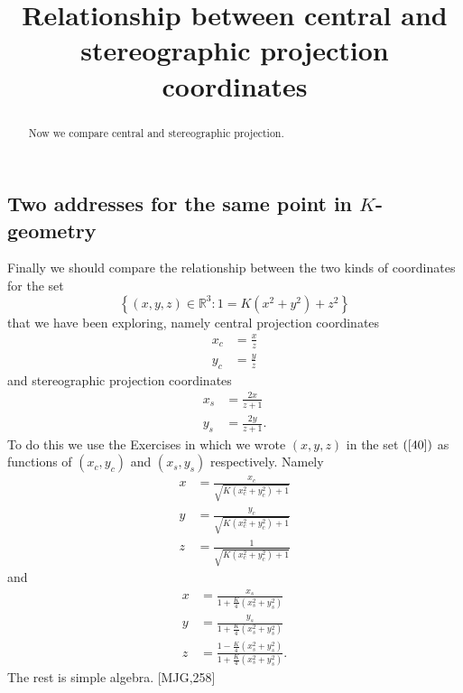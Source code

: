 \documentclass{ximera}
\title{Relationship between central and stereographic projection
  coordinates}
\begin{document}
\begin{abstract}
Now we compare central and stereographic projection.
\end{abstract}
\maketitle


\subsection*{Two addresses for the same point in $K$-geometry}

Finally we should compare the relationship between the two kinds of
coordinates for the set%
\begin{equation}
\left\{  \left(  x,y,z\right)  \in\mathbb{R}^{3}:1=K\left(  x^{2}%
+y^{2}\right)  +z^{2}\right\}  \label{40}%
\end{equation}
that we have been exploring, namely central projection coordinates%
\begin{align}
x_{c}  &  =\frac{x}{z}\label{70}\\
y_{c}  &  =\frac{y}{z}\nonumber
\end{align}
and stereographic projection coordinates%
\begin{align}
x_{s}  &  =\frac{2x}{z+1}\label{71}\\
y_{s}  &  =\frac{2y}{z+1}.\nonumber
\end{align}
To do this we use the Exercises in which we wrote $\left(  x,y,z\right)  $ in
the set $\left(  \ref{40}\right)  $ as functions of $\left(  x_{c}%
,y_{c}\right)  $ and $\left(  x_{s},y_{s}\right)  $ respectively. Namely%
\begin{align*}
x  &  =\frac{x_{c}}{\sqrt{K\left(  x_{c}^{2}+y_{c}^{2}\right)  +1}}\\
y  &  =\frac{y_{c}}{\sqrt{K\left(  x_{c}^{2}+y_{c}^{2}\right)  +1}}\\
z  &  =\frac{1}{\sqrt{K\left(  x_{c}^{2}+y_{c}^{2}\right)  +1}}%
\end{align*}
and%
\begin{align*}
x  &  =\frac{x_{s}}{1+\frac{K}{4}\left(  x_{s}^{2}+y_{s}^{2}\right)  }\\
y  &  =\frac{y_{s}}{1+\frac{K}{4}\left(  x_{s}^{2}+y_{s}^{2}\right)  }\\
z  &  =\frac{1-\frac{K}{4}\left(  x_{s}^{2}+y_{s}^{2}\right)  }{1+\frac{K}%
{4}\left(  x_{s}^{2}+y_{s}^{2}\right)  }.
\end{align*}
The rest is simple algebra. [MJG,258]
\end{document}
